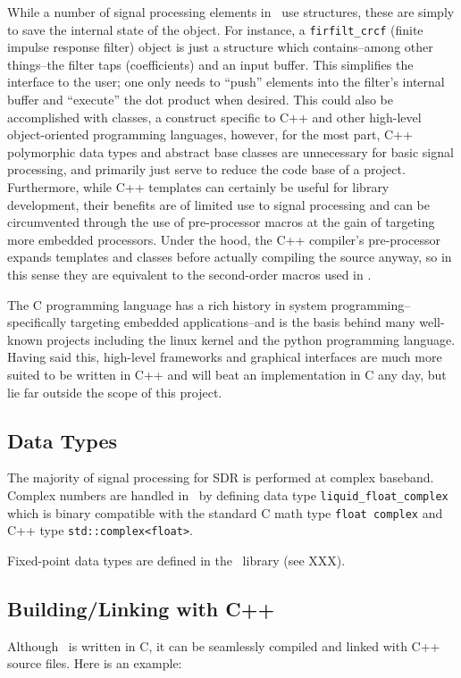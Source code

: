 While a number of signal processing elements in \liquid\ use structures, these
are simply to save the internal state of the object.
For instance, a {\tt firfilt\_crcf} (finite impulse response filter) object
is just a structure which contains--among other things--the filter taps
(coefficients) and an input buffer.
This simplifies the interface to the user; one only needs to ``push'' elements
into the filter's internal buffer and ``execute'' the dot product when
desired.
This could also be accomplished with classes, a construct specific to C++ and
other high-level object-oriented programming languages, however,
for the most part, C++ polymorphic data types and abstract base classes are
unnecessary for basic signal processing, and primarily just serve to reduce
the code base of a project.
Furthermore, while C++ templates can certainly be useful for library development,
their benefits are of limited use to signal processing and can be circumvented
through the use of pre-processor macros at the gain of targeting more embedded
processors.
Under the hood, the C++ compiler's pre-processor expands templates and classes
before actually compiling the source anyway, so in this sense they are
equivalent to the second-order macros used in \liquid.

The C programming language has a rich history in system programming--
specifically targeting embedded applications--and is the basis behind many
well-known projects including the linux kernel and the python programming
language.
Having said this, high-level frameworks and graphical interfaces are much more
suited to be written in C++ and will beat an implementation in C any day,
but lie far outside the scope of this project.

\subsection{Data Types}
The majority of signal processing for SDR is performed at complex baseband.
Complex numbers are handled in \liquid\ by defining data type
{\tt liquid\_float\_complex} which is binary compatible with the standard
C math type {\tt float complex} and C++ type {\tt std::complex<float>}.

Fixed-point data types are defined in the \liquidfpm\ library (see XXX).

\subsection{Building/Linking with C++}
Although \liquid\ is written in C, it can be seamlessly compiled and linked
with C++ source files.
Here is an example:




